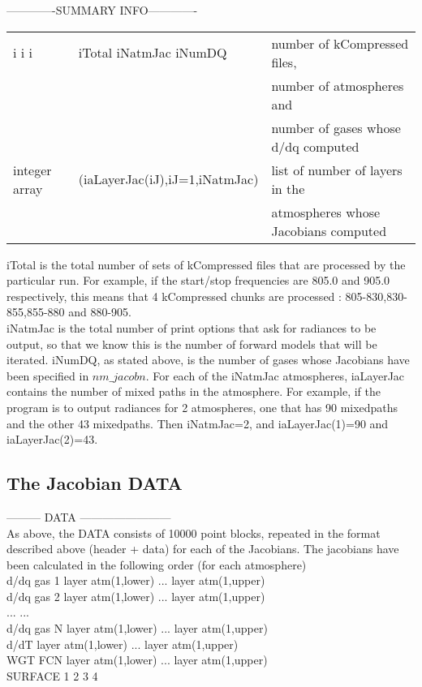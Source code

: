 \documentclass[12pt]{article}
\newlength{\colwidth}
\begin{document}
{{{{-------------SUMMARY INFO-------------\\
\begin{longtable}{llp{\colwidth}}
{\sf i i i} & \indent iTotal iNatmJac iNumDQ & number of kCompressed files, \\
            &                                & number of atmospheres and \\
            &                           & number of gases whose d/dq computed\\
{\sf integer array}  & \indent \indent (iaLayerJac(iJ),iJ=1,iNatmJac) &list 
  of number of layers in the \\
  &  & atmospheres whose Jacobians computed\\
\end{longtable}

iTotal is the total number of sets of kCompressed files that are processed by
the particular run. For example, if the start/stop frequencies are 805.0 and 
905.0 respectively, this means that 4 kCompressed chunks are processed : 
805-830,830-855,855-880 and 880-905. \\

iNatmJac is the total number of print options that ask for radiances to be
output, so that we know this is the number of forward models that will be
iterated. iNumDQ, as stated above, is the number of gases whose Jacobians
have been specified in $nm\_jacobn$. For each of the iNatmJac atmospheres, 
iaLayerJac contains the number of mixed paths in the atmosphere.
For example, if the program is to output radiances for 2 atmospheres, one 
that has 90 mixedpaths and the other 43 mixedpaths. Then iNatmJac=2, and 
iaLayerJac(1)=90 and iaLayerJac(2)=43.

\subsection{ The Jacobian DATA}
--------- DATA ------------------------\\

As above, the DATA consists of 10000 point blocks, repeated in the 
format described above (header + data) for each of the Jacobians. 
The jacobians have been calculated in the following order 
(for each atmosphere)\\

\indent  d/dq gas 1  layer atm(1,lower) ...  layer atm(1,upper)\\
\indent  d/dq gas 2  layer atm(1,lower) ...  layer atm(1,upper)\\
\indent  ...      ...\\
\indent  d/dq gas N  layer atm(1,lower) ...  layer atm(1,upper)\\
\indent  d/dT        layer atm(1,lower) ...  layer atm(1,upper)\\
\indent  WGT FCN     layer atm(1,lower) ...  layer atm(1,upper)\\
\indent  SURFACE     1 2 3 4\\

}}}}
\end{document}
